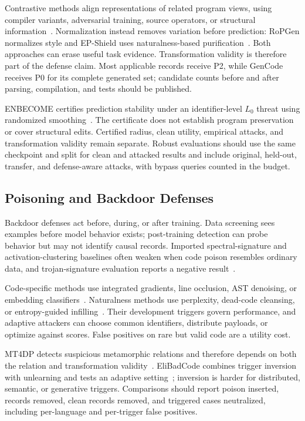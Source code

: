 \documentclass[acmsmall,screen,review]{acmart}
\begin{document}
Contrastive methods align representations of related program views, using compiler variants, adversarial training, source operators, or structural information~\cite{jain2021contracode,jia2023clawsat,liu2023contrabert,ding2022disco}. Normalization instead removes variation before prediction: RoPGen normalizes style and EP-Shield uses naturalness-based purification~\cite{li2022ropgen,mu2025epshield}. Both approaches can erase useful task evidence. Transformation validity is therefore part of the defense claim. Most applicable records receive P2, while GenCode receives P0 for its complete generated set; candidate counts before and after parsing, compilation, and tests should be published.

ENBECOME certifies prediction stability under an identifier-level $L_0$ threat using randomized smoothing~\cite{han2026enbecome}. The certificate does not establish program preservation or cover structural edits. Certified radius, clean utility, empirical attacks, and transformation validity remain separate. Robust evaluations should use the same checkpoint and split for clean and attacked results and include original, held-out, transfer, and defense-aware attacks, with bypass queries counted in the budget.

\subsection{Poisoning and Backdoor Defenses} \label{sec:defense:poison}
Backdoor defenses act before, during, or after training. Data screening sees examples before model behavior exists; post-training detection can probe behavior but may not identify causal records. Imported spectral-signature and activation-clustering baselines often weaken when code poison resembles ordinary data, and trojan-signature evaluation reports a negative result~\cite{ramakrishnan2022backdoors,wan2022yousee,schuster2021autocomplete,hussain2024trojan}.

Code-specific methods use integrated gradients, line occlusion, AST denoising, or embedding classifiers~\cite{li2024codepoisoner,hussain2025oseql,qu2024idba,ghannoum2025codegarrison}. Naturalness methods use perplexity, dead-code cleansing, or entropy-guided infilling~\cite{sun2025killbadcode,depa2025,mu2024codepurify}. Their development triggers govern performance, and adaptive attackers can choose common identifiers, distribute payloads, or optimize against scores. False positives on rare but valid code are a utility cost.

MT4DP detects suspicious metamorphic relations and therefore depends on both the relation and transformation validity~\cite{mt4dp2025}. EliBadCode combines trigger inversion with unlearning and tests an adaptive setting~\cite{sun2025elibadcode}; inversion is harder for distributed, semantic, or generative triggers. Comparisons should report poison inserted, records removed, clean records removed, and triggered cases neutralized, including per-language and per-trigger false positives.
\end{document}
